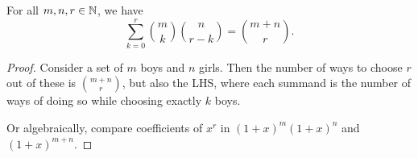\begin{theorem} \label{thm:permutations:zhu}
    For all $m, n, r \in \mathbb{N}$, we have \[
        \sum_{k=0}^{r} \binom{m}{k} \binom{n}{r-k} = \binom{m+n}{r}.
    \]
\end{theorem}
\begin{proof}
    Consider a set of $m$ boys and $n$ girls.
    Then the number of ways to choose $r$ out of these is $\binom{m+n}{r}$,
    but also the LHS, where each summand is the number of ways of doing so
    while choosing exactly $k$ boys.

    Or algebraically, compare coefficients of $x^r$ in $(1+x)^m(1+x)^n$ and
    $(1+x)^{m+n}$.
\end{proof}
